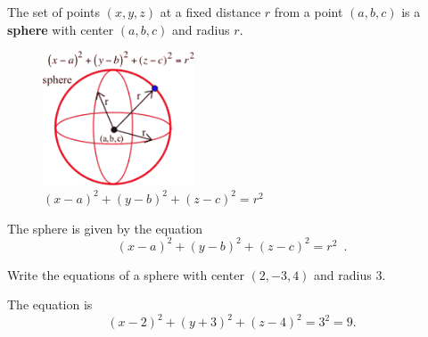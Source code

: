 \begin{definition}[Sphere]
The set of points $(x,y,z)$ at a fixed distance $r$ from a point $(a,b,c)$ is a {\bf sphere} with center $(a,b,c)$ and radius $r$.

\begin{figure}[!ht]
  \centering
    \includegraphics[width=0.4\textwidth]{img/chap4/image013.png}
    \caption{$(x-a)^2+(y-b)^2+(z-c)^2 = r^2$}
    \label{fig:4-1-sphere}
\end{figure}
The sphere is given by the equation
$$(x-a)^2+(y-b)^2+(z-c)^2=r^2 \enspace .$$
\end{definition}

\begin{example}
Write the equations of a sphere with center $(2, -3, 4)$ and radius 3.

\begin{solution} The equation is
$$(x-2)^2+(y+3)^2+(z-4)^2=3^2=9.$$
\end{solution}\end{example}

